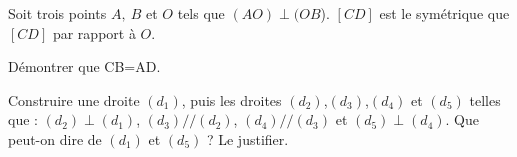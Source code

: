 
Soit trois points $A,~B$ et $O$ tels que $(AO)\perp (OB$). $[CD]$ est le symétrique que $[CD]$ par rapport à $O$. 

Démontrer que CB=AD.


Construire une droite $(d_1)$, puis les droites $(d_2)$,$(d_3)$,$(d_4)$ et $(d_5)$ telles que : $(d_2)\perp (d_1)$, $(d_3)//(d_2)$, $(d_4)//(d_3)$ et $(d_5)\perp (d_4)$. Que peut-on dire de $(d_1)$ et $(d_5)$ ? Le justifier.